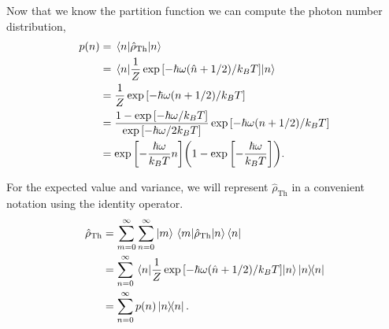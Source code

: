 \documentclass[../main.tex]{subfiles}
\begin{document}
Now that we know the partition function we can compute the photon number distribution,
\begin{align*}
    p(n) &= \expval{\hat{\rho}_{\mathrm{Th}}}{n} \\
        &= \expval{\frac{1}{Z}\exp\qty[-\hbar\omega\qty(\hat{n}+1/2)/k_BT]}{n} \\
        &= \frac{1}{Z}\exp\qty[-\hbar\omega\qty(n+1/2)/k_BT] \\
        &= \frac{1-\exp\qty[-\hbar\omega /k_BT]}{\exp\qty[-\hbar\omega/2k_BT]}\exp\qty[-\hbar\omega\qty(n+1/2)/k_BT] \\
        &= \exp\qty[-\frac{\hbar\omega }{k_BT}n]\qty(1-\exp\qty[-\frac{\hbar\omega}{k_BT}]).
\end{align*}

For the expected value and variance, we will represent $\hat{\rho}_{\mathrm{Th}}$ in a convenient notation using the identity operator.
\begin{align*}
    \hat{\rho}_{\mathrm{Th}} &= \sum_{m=0}^\infty\sum_{n=0}^\infty\ket{m}\mel{m}{\hat{\rho}_{\mathrm{Th}}}{n}\bra{n} \\
    &= \sum_{n=0}^\infty\expval{\frac{1}{Z}\exp\qty[-\hbar\omega\qty(\hat{n}+1/2)/k_BT]}{n}\op{n}{n} \\
    &= \sum_{n=0}^\infty p(n) \op{n}{n}.
\end{align*}
\end{document}
